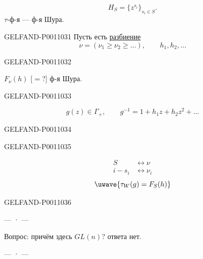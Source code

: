\[
H_S=\{z^{s_i}\}_{s_i\in S}.
\]
$\tau$-ф-я — ф-я Шура.


\begin{GelfandAdjacentEvidence}{GELFAND-P001103}{1}
Пусть есть \underline{разбиение}
\[
\nu=(\nu_1\geq\nu_2\geq\ldots),\qquad h_1,h_2,\ldots
\]
\end{GelfandAdjacentEvidence}
\begin{GelfandAdjacentEvidence}{GELFAND-P001103}{2}

$F_\nu(h)$ [$=$?] ф-я Шура.
\end{GelfandAdjacentEvidence}
\begin{GelfandAdjacentEvidence}{GELFAND-P001103}{3}


\[
g(z)\in\Gamma_+,\qquad g^{-1}=1+h_1z+h_2z^2+\ldots
\]
\end{GelfandAdjacentEvidence}
\begin{GelfandAdjacentEvidence}{GELFAND-P001103}{4}

\end{GelfandAdjacentEvidence}
\begin{GelfandAdjacentEvidence}{GELFAND-P001103}{5}

\[
\begin{aligned}
S&\leftrightarrow\nu\\
i-s_i&\leftrightarrow\nu_i
\end{aligned}
\]
\[
\text{\uwave{\(\tau_W(g)=F_S(h)\)}}
\]
\end{GelfandAdjacentEvidence}
\begin{GelfandAdjacentEvidence}{GELFAND-P001103}{6}


\begin{center}— · —\end{center}
Вопрос: причём здесь $GL(n)$? ответа нет.
\begin{center}— · —\end{center}
\end{GelfandAdjacentEvidence}
